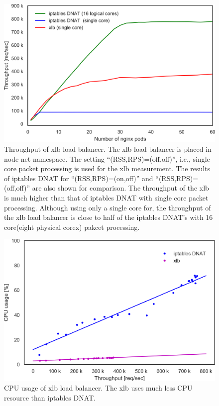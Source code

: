 \begin{figure}[h]
  \centering
  \includegraphics[width=0.8\columnwidth]{Figs/xlb_iptables_dnat_10g}
  \par\bigskip
  \centering
  \begin{minipage}{0.9\columnwidth}
    \caption[Throughput of xlb load balancer]{
      Throughput of xlb load balancer.
      The xlb load balancer is placed in node net namespace.
      The setting \enquote{(RSS,RPS)=(off,off)}, i.e., single core packet processing is used for the xlb measurement.
      The results of iptables DNAT for \enquote{(RSS,RPS)=(on,off)} and \enquote{(RSS,RPS)=(off,off)} are also shown for comparison.
      The throughput of the xlb is much higher than that of iptables DNAT with single core packet processing.
      Although using only a single core for, the throughput of the xlb load balancer is close to half of the iptables DNAT's with 16 core(eight physical corex) pakcet processing.
    }
    \label{fig:xlb_iptables_dnat_10g}
  \end{minipage}
\end{figure}


\begin{figure}[h]
  \centering
  \includegraphics[width=0.8\columnwidth]{Figs/cpu_usage_10g_xlb}
  \par\bigskip
  \centering
  \begin{minipage}{0.9\columnwidth}
    \caption[CPU usage of xlb load balancer]{
      CPU usage of xlb load balancer.
      The xlb uses much less CPU resource than iptables DNAT.
    }
    \label{fig:cpu_usage_10g_xlb}
  \end{minipage}
\end{figure}

